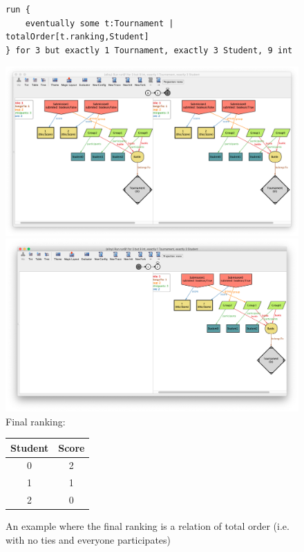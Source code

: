 \begin{figure}[h]
\caption{An example where the final ranking is a relation of total order (i.e. with no ties and everyone participates)}

\centering
\begin{lstlisting}[language=alloy]
run {
	eventually some t:Tournament |  totalOrder[t.ranking,Student] 
} for 3 but exactly 1 Tournament, exactly 3 Student, 9 int
\end{lstlisting}

\includegraphics[width=\textwidth]{Images/Second example 1.png}
\includegraphics[width=\textwidth]{Images/Second example 2.png}
Final ranking:


\begin{tabular}{c|c}
    Student & Score \\
    \hline
    0 & 2 \\
    1 & 1 \\
    2 & 0 \\
\end{tabular}
\end{figure}



